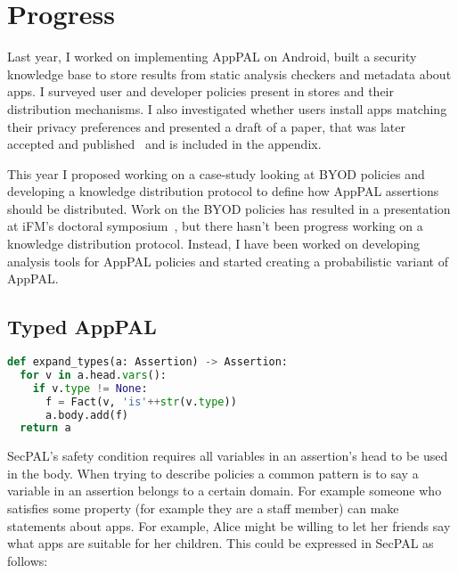 \documentclass[a4paper]{scrartcl}
\begin{document}

\section{Progress}
\label{sec:work}

Last year, I worked on implementing AppPAL on Android, built a security
knowledge base to store results from static analysis checkers and metadata about
apps. I surveyed user and developer policies present in stores and
their distribution mechanisms. I also investigated whether users install apps
matching their privacy preferences and presented a draft of a paper, that was
later accepted and published~\cite{hallett_apppal_2016} and is included in the appendix.

This year I proposed working on a case-study looking at BYOD policies and
developing a knowledge distribution protocol to define how AppPAL assertions
should be distributed.  Work on the BYOD policies has resulted in a presentation
at iFM's doctoral symposium~\cite{hallett_specifying_2016}, but there hasn't
been progress working on a knowledge distribution protocol.  Instead, I have been
worked on developing analysis tools for AppPAL policies and started creating a
probabilistic variant of AppPAL.

\subsection{Typed AppPAL}
\label{sec:types}

\begin{lstlisting}[language=Python, float, caption={Procedure used to expand types from AppPAL into SecPAL.}]
def expand_types(a: Assertion) -> Assertion:
  for v in a.head.vars():
    if v.type != None:
      f = Fact(v, 'is'++str(v.type))
      a.body.add(f)
  return a
\end{lstlisting}

SecPAL's safety condition requires all variables in an assertion's head to be
used in the body. When trying to describe policies a common pattern is to say a
variable in an assertion belongs to a certain domain. For example someone who
satisfies some property (for example they are a staff member) can make
statements about apps.
For example, Alice might be willing to let her friends say what apps are
suitable for her children.  This could be expressed in SecPAL as follows:
\end{document}
